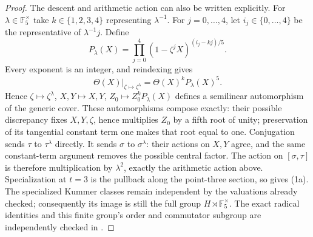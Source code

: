 \begin{proof}
The descent and arithmetic action can also be written
explicitly. For \(\lambda\in\mathbb F_5^\times\)
take \(k\in\{1,2,3,4\}\) representing
\(\lambda^{-1}\). For \(j=0,\ldots,4\), let
\(i_j\in\{0,\ldots,4\}\) be the representative
of \(\lambda^{-1}j\). Define
\[
 P_\lambda(X)=
       \prod_{j=0}^4(1-\zeta^jX)^{(i_j-kj)/5}.
\]
Every exponent is an integer, and reindexing gives
\[
 \Theta(X)\big|_{\zeta\mapsto\zeta^\lambda}
             =\Theta(X)^kP_\lambda(X)^5.
\]
Hence \(\zeta\mapsto\zeta^\lambda\), \(X,Y\mapsto X,Y\),
\(Z_0\mapsto Z_0^kP_\lambda(X)\) defines a semilinear
automorphism of the generic cover. These automorphisms
compose exactly: their possible discrepancy fixes
\(X,Y,\zeta\), hence multiplies \(Z_0\) by a fifth
root of unity; preservation of its tangential constant
term one makes that root equal to one. Conjugation sends
\(\tau\) to \(\tau^\lambda\) directly. It sends
\(\sigma\) to \(\sigma^\lambda\): their actions on
\(X,Y\) agree, and the same constant-term argument
removes the possible central factor. The action on
\([\sigma,\tau]\) is therefore multiplication by
\(\lambda^2\), exactly the arithmetic action above.
Specialization at \(t=3\) is the pullback along the
point-three section, so gives (1a). The specialized
Kummer classes remain independent by the valuations
already checked; consequently its image is still the
full group \(H\rtimes\mathbb F_5^\times\).
The exact radical identities and this finite group's
order and commutator subgroup are independently checked
in .


\end{proof}

